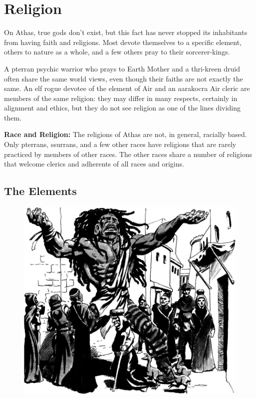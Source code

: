 \section{Religion}
On Athas, true gods don't exist, but this fact has never stopped its inhabitants from having faith and religions. Most devote themselves to a specific element, others to nature as a whole, and a few others pray to their sorcerer-kings.

A pterran psychic warrior who prays to Earth Mother and a thri-kreen druid often share the same world views, even though their faiths are not exactly the same. An elf rogue devotee of the element of Air and an aarakocra Air cleric are members of the same religion: they may differ in many respects, certainly in alignment and ethics, but they do not see religion as one of the lines dividing them.

\textbf{Race and Religion:} The religions of Athas are not, in general, racially based. Only pterrans, ssurrans, and a few other races have religions that are rarely practiced by members of other races. The other races share a number of religions that welcome clerics and adherents of all races and origins.

\subsection{The Elements}
\begin{figure}[b!]
\centering
\includegraphics[height=0.4\paperheight]{images/halfgiant-2.png}
\end{figure}

